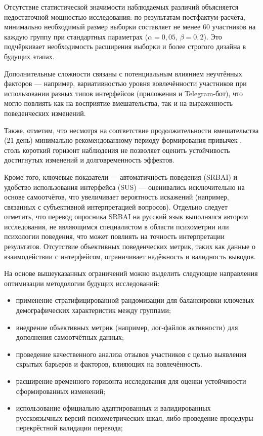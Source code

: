 \documentclass[pdflatex,sn-mathphys-num]{sn-jnl}%
\theoremstyle{thmstyleone}%
\theoremstyle{thmstyletwo}%
\theoremstyle{thmstylethree}%
\begin{document}
Отсутствие статистической значимости наблюдаемых различий объясняется недостаточной мощностью исследования: по результатам постфактум-расчёта, минимально необходимый размер выборки составляет не менее 60 участников на каждую группу при стандартных параметрах ($\alpha = 0{,}05$, $\beta = 0{,}2$). Это подчёркивает необходимость расширения выборки и более строгого дизайна в будущих этапах.

Дополнительные сложности связаны с потенциальным влиянием неучтённых факторов — например, вариативностью уровня вовлечённости участников при использовании разных типов интерфейсов (приложения и Telegram-бот), что могло повлиять как на восприятие вмешательства, так и на выраженность поведенческих изменений. 

Также, отметим, что несмотря на соответствие продолжительности вмешательства (21 день) минимально рекомендованному периоду формирования привычек \cite{lally_how_2010}, столь короткий горизонт наблюдения не позволяет оценить устойчивость достигнутых изменений и долговременность эффектов.

Кроме того, ключевые показатели — автоматичность поведения (SRBAI) и удобство использования интерфейса (SUS) — оценивались исключительно на основе самоотчётов, что увеличивает вероятность искажений (например, связанных с субъективной интерпретацией вопросов). Отдельно следует отметить, что перевод опросника SRBAI на русский язык выполнялся автором исследования, не являющимся специалистом в области психометрии или психологии поведения, что может повлиять на точность интерпретации результатов. Отсутствие объективных поведенческих метрик, таких как данные о взаимодействии с интерфейсом, ограничивает надёжность и валидность выводов.

На основе вышеуказанных ограничений можно выделить следующие направления оптимизации методологии будущих исследований:

\begin{itemize}
    \item применение стратифицированной рандомизации для балансировки ключевых демографических характеристик между группами;
    \item внедрение объективных метрик (например, лог-файлов активности) для дополнения самоотчётных данных;
    \item проведение качественного анализа отзывов участников с целью выявления скрытых барьеров и факторов, влияющих на вовлечённость.
    \item расширение временного горизонта исследования для оценки устойчивости сформированных изменений;
    \item использование официально адаптированных и валидированных русскоязычных версий психометрических шкал, либо проведение процедуры перекрёстной валидации перевода;
\end{itemize}
\end{document}
